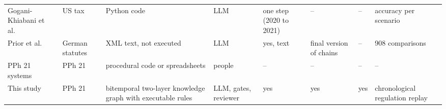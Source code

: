 \begin{table}[!t]
\begin{tabularx}{\textwidth}{@{}P{3.0cm} P{1.9cm} L P{2.0cm} P{1.6cm} P{1.5cm} P{1.2cm} P{2.3cm}@{}}
Gogani-Khiabani et al.~\cite{goganikhiabani2025maintaining} & US tax & Python code & LLM & one step (2020 to 2021) & -- & -- & accuracy per scenario \\
Prior et al.~\cite{prior2025risks} & German statutes & XML text, not executed & LLM & yes, text & final version of chains & -- & 908 comparisons \\
PPh 21 systems~\cite{ramadhani2021grossup,yulistyawati2022payroll,kusuma2026pph21} & PPh 21 & procedural code or spreadsheets & people & -- & -- & -- & -- \\
\midrule
This study & PPh 21 & bitemporal two-layer knowledge graph with executable rules & LLM, gates, reviewer & yes & yes & yes & chronological regulation replay \\
\bottomrule
\end{tabularx}
\end{table}
